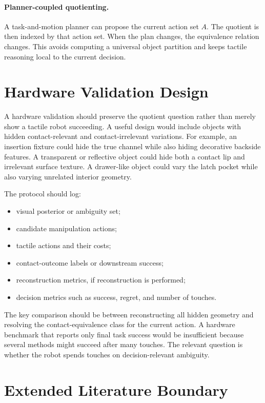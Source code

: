 \documentclass{article}
\begin{document}
\paragraph{Planner-coupled quotienting.}
A task-and-motion planner can propose the current action set $A$. The quotient is then indexed by that action set. When the plan changes, the equivalence relation changes. This avoids computing a universal object partition and keeps tactile reasoning local to the current decision.

\section{Hardware Validation Design}

A hardware validation should preserve the quotient question rather than merely show a tactile robot succeeding. A useful design would include objects with hidden contact-relevant and contact-irrelevant variations. For example, an insertion fixture could hide the true channel while also hiding decorative backside features. A transparent or reflective object could hide both a contact lip and irrelevant surface texture. A drawer-like object could vary the latch pocket while also varying unrelated interior geometry.

The protocol should log:
\begin{itemize}
    \item visual posterior or ambiguity set;
    \item candidate manipulation actions;
    \item tactile actions and their costs;
    \item contact-outcome labels or downstream success;
    \item reconstruction metrics, if reconstruction is performed;
    \item decision metrics such as success, regret, and number of touches.
\end{itemize}

The key comparison should be between reconstructing all hidden geometry and resolving the contact-equivalence class for the current action. A hardware benchmark that reports only final task success would be insufficient because several methods might succeed after many touches. The relevant question is whether the robot spends touches on decision-relevant ambiguity.

\section{Extended Literature Boundary}
\end{document}
